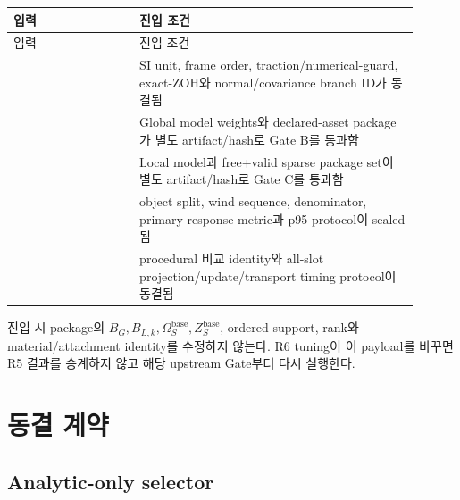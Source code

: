 \documentclass[10pt]{article}
\begin{document}
\begin{longtable}{L{0.28\linewidth}L{0.62\linewidth}}
\toprule
입력 & 진입 조건\\
\midrule
\endfirsthead
\toprule
입력 & 진입 조건\\
\midrule
\endhead
{}\newline{}\newline{} & SI unit, frame order, traction/numerical-guard, exact-ZOH와 normal/covariance branch ID가 동결됨\\
\newline{}\newline{} & Global model weights와 declared-asset package가 별도 artifact/hash로 Gate B를 통과함\\
\newline{}\newline{} & Local model과 free+valid sparse package set이 별도 artifact/hash로 Gate C를 통과함\\
\newline{}\newline{} & object split, wind sequence, denominator, primary response metric과 p95 protocol이 sealed됨\\
\newline{} & procedural 비교 identity와 all-slot projection/update/transport timing protocol이 동결됨\\
\bottomrule
\end{longtable}

진입 시 package의 \(B_G,B_{L,k},\Omega_S^{\mathrm{base}},Z_S^{\mathrm{base}}\),
ordered support, rank와 material/attachment identity를 수정하지 않는다. R6 tuning이 이 payload를
바꾸면 R5 결과를 승계하지 않고 해당 upstream Gate부터 다시 실행한다.

\section{동결 계약}
\label{sec:r6-chapter-3}

\subsection{Analytic-only selector}
\end{document}
